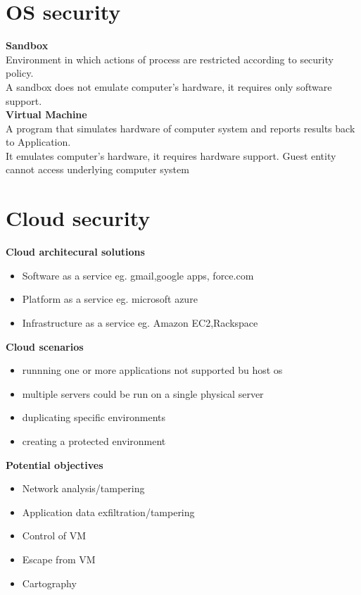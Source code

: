 \documentclass[10pt,a4paper]{book}
\begin{document}
\chapter{OS security}
\textbf{Sandbox}\\
Environment in which actions of process are restricted according to security policy.\\
A sandbox does not emulate computer's hardware, it requires only software support.\\
\textbf{Virtual Machine}\\
A program that simulates hardware of computer system and reports results back to Application.\\
It emulates computer's hardware, it requires hardware support. Guest entity cannot access underlying computer system
\chapter{Cloud security}
\textbf{Cloud architecural solutions}
\begin{itemize}
\item Software as a service eg. gmail,google apps, force.com
\item Platform as a service eg. microsoft azure
\item Infrastructure as a service eg. Amazon EC2,Rackspace
\end{itemize}
\textbf{Cloud scenarios}
\begin{itemize}
\item runnning one or more applications not supported bu host os
\item multiple servers could be run on a single physical server
\item duplicating specific environments
\item creating a protected environment
\end{itemize}
\textbf{Potential objectives}
\begin{itemize}
\item Network analysis/tampering
\item Application data exfiltration/tampering
\item Control of VM
\item Escape from VM
\item Cartography
\end{itemize}
\end{document}
